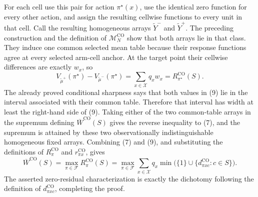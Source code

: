 For each cell use this pair for action \(\pi^\star(x)\), use the identical zero function for every other action, and assign the resulting cellwise functions to every unit in that cell.  Call the resulting homogeneous arrays \(\widetilde Y^-\) and \(\widetilde Y^+\).  The preceding construction and the definition of \(\mathcal M_N^{\mathrm{CO}}\) show that both arrays lie in that class.  They induce one common selected mean table because their response functions agree at every selected arm-cell anchor.  At the target point their cellwise differences are exactly \(w_x\), so
\[
V_{\widetilde\mu^+}(\pi^\star)
-V_{\widetilde\mu^-}(\pi^\star)
=\sum_{x\in\mathcal X}q_x w_x
=R^{\mathrm{CO}}_{\pi^\star}(S).
\tag{9}
\]
The already proved conditional sharpness says that both values in (9) lie in the interval associated with their common table.  Therefore that interval has width at least the right-hand side of (9).  Taking either of the two common-table arrays in the supremum defining \(\overline W^{\mathrm{CO}}(S)\) gives the reverse inequality to (7), and the supremum is attained by these two observationally indistinguishable homogeneous fixed arrays.  Combining (7) and (9), and substituting the definitions of \(R^{\mathrm{CO}}_\pi\) and \(r^{\mathrm{CO}}_{\pi x}\), gives
\[
\overline W^{\mathrm{CO}}(S)
=\max_{\pi\in\mathcal F}R^{\mathrm{CO}}_\pi(S)
=\max_{\pi\in\mathcal F}\sum_{x\in\mathcal X}q_x
\min\bigl(\{1\}\cup\{d^{\mathrm{CO}}_{\pi xc}:c\in S\}\bigr).
\]
The asserted zero-residual characterization is exactly the dichotomy following the definition of \(d^{\mathrm{CO}}_{\pi xc}\), completing the proof.
